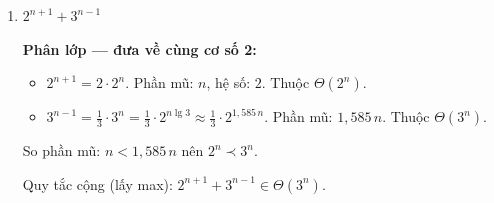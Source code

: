 \documentclass[12pt,a4paper]{article}
\begin{document}
\begin{enumerate}[label=\textbf{\alph*.}]
  \textbf{Phân lớp:} Rút gọn từng phần:

  \textit{Phần 1:} $2n\lg(n+2)^2 = 2n \cdot 2\lg(n+2) = 4n\lg(n+2)$.

  Khi $n$ đủ lớn: $\lg(n+2) \approx \lg n$. Vậy Phần 1 $\in \Theta(n\log n)$.

  \textit{Phần 2:} $(n+2)^2\lg\frac{n}{2} = (n+2)^2(\lg n - \lg 2) = (n+2)^2(\lg n - 1)$.

  Khi $n$ đủ lớn: $(n+2)^2 \approx n^2$ và $\lg n - 1 \approx \lg n$. Vậy Phần 2 $\in \Theta(n^2\log n)$.

  \textit{Gộp lại (quy tắc cộng --- lấy max):}
  \[
    \max\bigl(\Theta(n\log n),\; \Theta(n^2\log n)\bigr) = \Theta(n^2\log n).
  \]

  $\Longrightarrow \boxed{2n\lg(n+2)^2 + (n+2)^2\lg\frac{n}{2} \in \Theta(n^2\lg n)}$

  \textbf{Chứng minh (sketch):}

  \textit{Chặn trên:} Với $n \geq 2$:
  \begin{align*}
    &4n\lg(n+2) + (n+2)^2(\lg n - 1) \\
    &\leq 4n \cdot 2\lg n + (2n)^2 \cdot \lg n \quad (\text{vì } n+2 \leq 2n,\; \lg(n+2) \leq 2\lg n) \\
    &= 8n\lg n + 4n^2\lg n = (8n + 4n^2)\lg n \leq 5n^2\lg n.
  \end{align*}
  Chọn $c_2 = 5$, $n_0$ đủ lớn.

  \textit{Chặn dưới:} Chỉ cần lấy Phần 2:
  \[
    (n+2)^2(\lg n - 1) \geq n^2 \cdot \frac{1}{2}\lg n = \frac{1}{2}n^2\lg n, \quad \text{với } n \geq 4.
  \]
  Chọn $c_1 = \frac{1}{2}$, $n_0 = 4$. \checkmark

  \bigskip

  \item $2^{n+1} + 3^{n-1}$

  \textbf{Phân lớp --- đưa về cùng cơ số 2:}

  \begin{itemize}
    \item $2^{n+1} = 2 \cdot 2^n$. Phần mũ: $n$, hệ số: $2$. Thuộc $\Theta(2^n)$.
    \item $3^{n-1} = \frac{1}{3} \cdot 3^n = \frac{1}{3} \cdot 2^{n\lg 3} \approx \frac{1}{3} \cdot 2^{1{,}585\,n}$. Phần mũ: $1{,}585\,n$. Thuộc $\Theta(3^n)$.
  \end{itemize}

  So phần mũ: $n < 1{,}585\,n$ nên $2^n \prec 3^n$.

  Quy tắc cộng (lấy max): $2^{n+1} + 3^{n-1} \in \Theta(3^n)$.


\end{enumerate}
\end{document}
